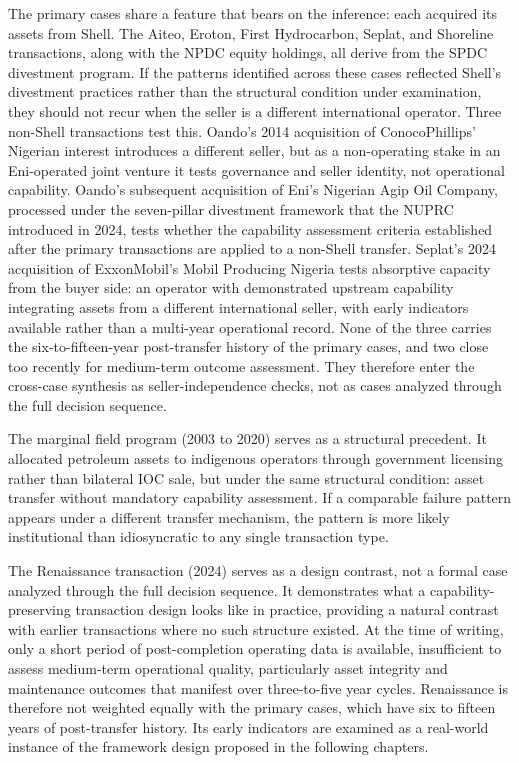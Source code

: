 The primary cases share a feature that bears on the inference: each
acquired its assets from Shell. The Aiteo, Eroton, First Hydrocarbon,
Seplat, and Shoreline transactions, along with the NPDC equity holdings,
all derive from the SPDC divestment program. If the patterns identified
across these cases reflected Shell's divestment practices rather than
the structural condition under examination, they should not recur when
the seller is a different international operator. Three non-Shell
transactions test this. Oando's 2014 acquisition of ConocoPhillips'
Nigerian interest introduces a different seller, but as a non-operating
stake in an Eni-operated joint venture it tests governance and seller
identity, not operational capability. Oando's subsequent acquisition of
Eni's Nigerian Agip Oil Company, processed under the seven-pillar
divestment framework that the NUPRC introduced in 2024, tests whether
the capability assessment criteria established after the primary
transactions are applied to a non-Shell transfer. Seplat's 2024
acquisition of ExxonMobil's Mobil Producing Nigeria tests absorptive
capacity from the buyer side: an operator with demonstrated upstream
capability integrating assets from a different international seller,
with early indicators available rather than a multi-year operational
record. None of the three carries the six-to-fifteen-year post-transfer
history of the primary cases, and two close too recently for medium-term
outcome assessment. They therefore enter the cross-case synthesis as
seller-independence checks, not as cases analyzed through the full
decision sequence.

The marginal field program (2003 to 2020) serves as a structural
precedent. It allocated petroleum assets to indigenous operators through
government licensing rather than bilateral IOC sale, but under the same
structural condition: asset transfer without mandatory capability
assessment. If a comparable failure pattern appears under a different
transfer mechanism, the pattern is more likely institutional than
idiosyncratic to any single transaction type.

The Renaissance transaction (2024) serves as a design contrast, not a
formal case analyzed through the full decision sequence. It demonstrates
what a capability-preserving transaction design looks like in practice,
providing a natural contrast with earlier transactions where no such
structure existed. At the time of writing, only a short period of
post-completion operating data is available, insufficient to assess
medium-term operational quality, particularly asset integrity and
maintenance outcomes that manifest over three-to-five year cycles.
Renaissance is therefore not weighted equally with the primary cases,
which have six to fifteen years of post-transfer history. Its early
indicators are examined as a real-world instance of the framework design
proposed in the following chapters.

